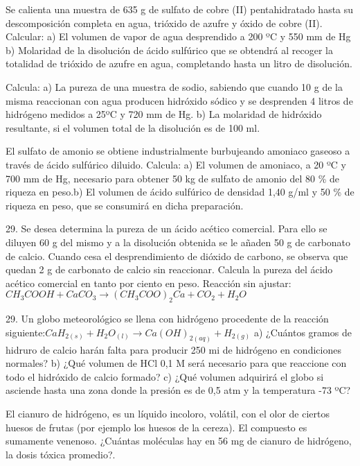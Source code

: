 \begin{problem}
Se calienta una muestra de 635 g de sulfato de cobre (II) pentahidratado hasta su descomposición completa en agua, trióxido de azufre y óxido de cobre (II). Calcular: a) El volumen de vapor de agua desprendido a 200 ºC y 550 mm de Hg b)	Molaridad de la disolución de ácido sulfúrico que se obtendrá al recoger la totalidad de trióxido de azufre en agua, completando hasta un litro de disolución.
\end{problem}
\begin{problem}
Calcula: a) La pureza de una muestra de sodio, sabiendo que cuando 10 g de la misma reaccionan con agua producen hidróxido sódico y se desprenden 4 litros de hidrógeno medidos a 25ºC y 720 mm de Hg. b) La molaridad de hidróxido resultante, si el volumen total de la disolución es de 100 ml.
\end{problem}
\begin{problem}
El sulfato de amonio se obtiene industrialmente burbujeando amoniaco gaseoso a través de ácido sulfúrico diluido. Calcula: a)	El volumen de amoniaco, a 20 ºC y 700 mm de Hg, necesario para obtener 50 kg de sulfato de amonio del 80 \% de riqueza en peso.b) El volumen de ácido sulfúrico de densidad 1,40 g/ml y 50 \% de riqueza en peso, que se consumirá en dicha preparación.
\end{problem}
\begin{problem}
29.	Se desea determina la pureza de un ácido acético comercial. Para ello se diluyen 60 g del mismo y a la disolución obtenida se le añaden 50 g de carbonato de calcio. Cuando cesa el desprendimiento de dióxido de carbono, se observa que quedan 2 g de carbonato de calcio sin reaccionar. Calcula la pureza del ácido acético comercial en tanto por ciento en peso. Reacción sin ajustar: $CH_3COOH + CaCO_3 \longrightarrow (CH_3COO)_2Ca + CO_2 + H_2O$	
\end{problem}
\begin{problem}
	29.	Un globo meteorológico se llena con hidrógeno procedente de la reacción siguiente:$CaH_{2(s)} + H_2O_{(l)} \longrightarrow Ca(OH)_{2(aq)} + H_{2(g)}$
a)	¿Cuántos gramos de hidruro de calcio harán falta para producir 250 mi de hidrógeno en condiciones normales?
b)	¿Qué volumen de HCl 0,1 M será necesario para que reaccione con todo el hidróxido de calcio formado?
c)	¿Qué volumen adquirirá el globo si asciende hasta una zona donde la presión es de 0,5 atm y la temperatura -73 ºC?
\end{problem}
\begin{problem}
El cianuro de hidrógeno, es un líquido incoloro, volátil, con el olor de ciertos huesos de frutas (por ejemplo los huesos de la cereza). El compuesto es sumamente venenoso. ¿Cuántas moléculas hay en 56 mg de cianuro de hidrógeno, la dosis tóxica promedio?.
\end{problem}

